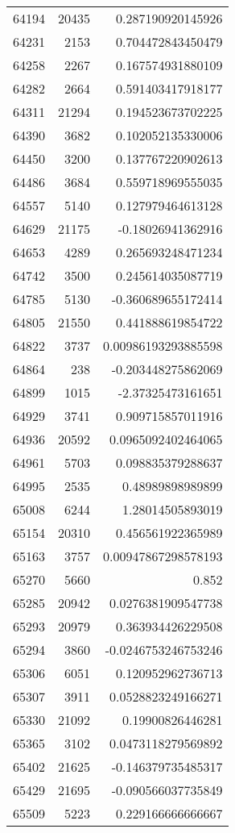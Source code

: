\begin{tabular}{r | r | r}
64194 & 20435 & 0.287190920145926 \\
64231 & 2153 & 0.704472843450479 \\
64258 & 2267 & 0.167574931880109 \\
64282 & 2664 & 0.591403417918177 \\
64311 & 21294 & 0.194523673702225 \\
64390 & 3682 & 0.102052135330006 \\
64450 & 3200 & 0.137767220902613 \\
64486 & 3684 & 0.559718969555035 \\
64557 & 5140 & 0.127979464613128 \\
64629 & 21175 & -0.18026941362916 \\
64653 & 4289 & 0.265693248471234 \\
64742 & 3500 & 0.245614035087719 \\
64785 & 5130 & -0.360689655172414 \\
64805 & 21550 & 0.441888619854722 \\
64822 & 3737 & 0.00986193293885598 \\
64864 & 238 & -0.203448275862069 \\
64899 & 1015 & -2.37325473161651 \\
64929 & 3741 & 0.909715857011916 \\
64936 & 20592 & 0.0965092402464065 \\
64961 & 5703 & 0.098835379288637 \\
64995 & 2535 & 0.48989898989899 \\
65008 & 6244 & 1.28014505893019 \\
65154 & 20310 & 0.456561922365989 \\
65163 & 3757 & 0.00947867298578193 \\
65270 & 5660 & 0.852 \\
65285 & 20942 & 0.0276381909547738 \\
65293 & 20979 & 0.363934426229508 \\
65294 & 3860 & -0.0246753246753246 \\
65306 & 6051 & 0.120952962736713 \\
65307 & 3911 & 0.0528823249166271 \\
65330 & 21092 & 0.19900826446281 \\
65365 & 3102 & 0.0473118279569892 \\
65402 & 21625 & -0.146379735485317 \\
65429 & 21695 & -0.090566037735849 \\
65509 & 5223 & 0.229166666666667 \\

\end{tabular}
